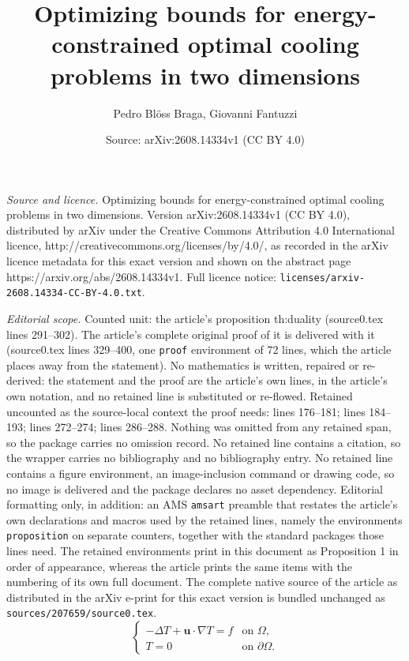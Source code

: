 \documentclass[10pt,a4paper]{amsart}
\title{Optimizing bounds for energy-constrained optimal cooling problems in two dimensions}
\author{Pedro Bl\"oss Braga, Giovanni Fantuzzi}
\date{Source: arXiv:2608.14334v1 (CC BY 4.0)}
\renewcommand{\vec}[1]{\mathbf{#1}}
\begin{document}
\maketitle

\noindent\emph{Source and licence.} Optimizing bounds for energy-constrained optimal cooling problems in two dimensions. Version arXiv:2608.14334v1 (CC BY 4.0), distributed by arXiv under the Creative Commons Attribution 4.0 International licence, http://creativecommons.org/licenses/by/4.0/, as recorded in the arXiv licence metadata for this exact version and shown on the abstract page https://arxiv.org/abs/2608.14334v1. Full licence notice: \texttt{licenses/arxiv-2608.14334-CC-BY-4.0.txt}.\par\smallskip

\noindent\textit{Editorial scope.} Counted unit: the article's proposition th:duality (source0.tex lines 291--302). The article's complete original proof of it is delivered with it (source0.tex lines 329--400, one \texttt{proof} environment of 72 lines, which the article places away from the statement). No mathematics is written, repaired or re-derived: the statement and the proof are the article's own lines, in the article's own notation, and no retained line is substituted or re-flowed.  Retained uncounted as the source-local context the proof needs: lines 176--181; lines 184--193; lines 272--274; lines 286--288.  Nothing was omitted from any retained span, so the package carries no omission record.  No retained line contains a citation, so the wrapper carries no bibliography and no bibliography entry.  No retained line contains a figure environment, an image-inclusion command or drawing code, so no image is delivered and the package declares no asset dependency.  Editorial formatting only, in addition: an AMS \texttt{amsart} preamble that restates the article's own declarations and macros used by the retained lines, namely the environments \texttt{proposition} on separate counters, together with the standard packages those lines need.  The retained environments print in this document as Proposition 1 in order of appearance, whereas the article prints the same items with the numbering of its own full document.  The complete native source of the article as distributed in the arXiv e-print for this exact version is bundled unchanged as \texttt{sources/207659/source0.tex}.
\begin{equation}\label{e:ade}
    \begin{cases}
        - \Delta T + \vec{u}\cdot \nabla T =  f &\text{on }\Omega,\\
        T=0 &\text{on }\partial\Omega.
    \end{cases}
\end{equation}
\end{document}
